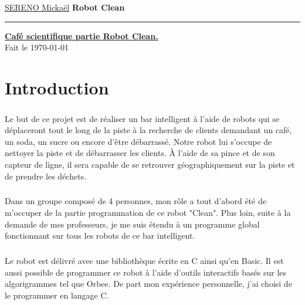 \documentclass[12pt,oneside,a4paper]{book}
\renewcommand{\headrulewidth}{0pt}
\begin{document}
\begin{titlepage}

	\thispagestyle{firstPage}
	\renewcommand{\headrulewidth}{0pt}
	\underline{SERENO Mickaël} \hfill \textbf{Robot Clean}
	{\color{red}\rule{\linewidth}{0.5pt}}

	\vfill

	\begin{center}
		{\huge \underline{\textbf{Café scientifique partie Robot Clean.}}}
		\\
		{\large Fait le \today }
	\end{center}
	\vfill
\end{titlepage}

\frontmatter
\renewcommand{\contentsname}{Sommaire}

\thispagestyle{TOC}
\tableofcontents
\renewcommand{\headrulewidth}{1pt}
\setcounter{tocdepth}{2}

\renewcommand{\headrulewidth}{0pt}
\chapter{Introduction}
	\thispagestyle{FM}
	\paragraph{} Le but de ce projet est de réaliser un bar intelligent à l'aide de robots qui se déplaceront tout le long de la piste à la recherche de clients demandant un café, un soda, un sucre ou encore d'être débarrassé. Notre robot lui s'occupe de nettoyer la piste et de débarrasser les clients. À l'aide de sa pince et de son capteur de ligne, il sera capable de se retrouver géographiquement sur la piste et de prendre les déchets.
	\paragraph{} Dans un groupe composé de 4 personnes, mon rôle a tout d'abord été de m'occuper de la partie programmation de ce robot "Clean". Plus loin, suite à la demande de mes professeurs, je me suis étendu à un programme global fonctionnant sur tous les robots de ce bar intelligent.
	\paragraph{} Le robot est délivré avec une bibliothèque écrite en C ainsi qu'en Basic. Il est aussi possible de programmer ce robot à l'aide d'outils interactifs basés sur les algorigrammes tel que Orbee. De part mon expérience personnelle, j'ai choisi de le programmer en langage C.
\end{document}
